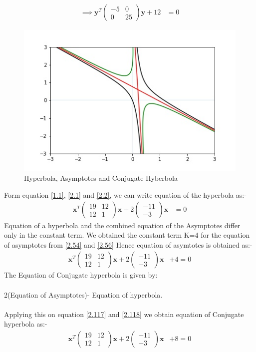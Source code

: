 \documentclass[journal,12pt,twocolumn]{IEEEtran}
\let\vec\mathbf
\numberwithin{equation}{subsection}
\newcommand{\myvec}[1]{\ensuremath{\begin{pmatrix}#1\end{pmatrix}}}
\begin{document}
\begin{align}
     \implies\vec{y}^T\myvec{-5 & 0 \\0 & 25}\vec{y} + 12&= 0
\end{align}
\begin{figure}[!]
\includegraphics[width=1\columnwidth]{hyperbola.jpg}
\caption{Hyperbola, Asymptotes and Conjugate Hyberbola}
\end{figure}

Form equation \ref{1.1}, \ref{2.1} and \ref{2.2}, we can write equation of the hyperbola as:-
\begin{align}
\vec{x}^T\myvec{19 & 12 \\12 & 1}\vec{x} +2\myvec{-11 \\-3} \vec{x}&= 0 \label{2.117}
\end{align}
Equation of a hyperbola and the combined equation of the Asymptotes differ only in the constant term. We obtained the constant term K=4 for the equation of asymptotes from \ref{2.54} and \ref{2.56}
Hence equation of asymtotes is obtained as:-
\begin{align}
\vec{x}^T\myvec{19 & 12 \\12 & 1}\vec{x} +2\myvec{-11 \\-3} \vec{x}&+4= 0 \label{2.118}
\end{align}
 The Equation of Conjugate hyperbola is given by:\\
\\
2(Equation of Asymptotes)- Equation of hyperbola.\\
\\
Applying this on equation \ref{2.117} and \ref{2.118} we obtain equation of Conjugate hyperbola as:-
\begin{align}
\vec{x}^T\myvec{19 & 12 \\12 & 1}\vec{x} +2\myvec{-11 \\-3} \vec{x}&+8= 0 \label{2.119}
\end{align}
\end{document}
